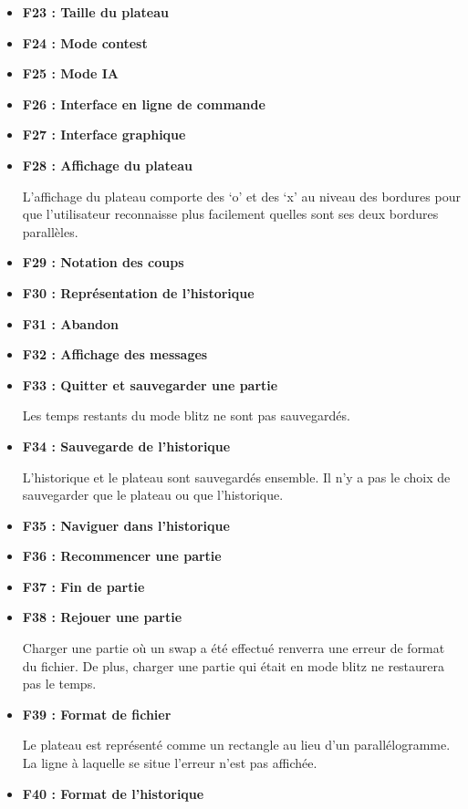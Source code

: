 \documentclass[12pt]{article}
\begin{document}
\begin{itemize}
    Au lieu de changer de couleur, le second joueur peut choisir d’écraser le coup du premier. Ceci produit le même résultat et permet de conserver sa couleur.
    \item \textbf{F23 : Taille du plateau}
    \item \textbf{F24 : Mode contest}
    \item \textbf{F25 : Mode IA}
    \item \textbf{F26 : Interface en ligne de commande}
    \item \textbf{F27 : Interface graphique}
    \item \textbf{F28 : Affichage du plateau}

    L’affichage du plateau comporte des ‘o’ et des ‘x’ au niveau des bordures pour que l’utilisateur reconnaisse plus facilement quelles sont ses deux bordures parallèles.
    \item \textbf{F29 : Notation des coups}
    \item \textbf{F30 : Représentation de l’historique}
    \item \textbf{F31 : Abandon}
    \item \textbf{F32 : Affichage des messages}
    \item \textbf{F33 : Quitter et sauvegarder une partie}

    Les temps restants du mode blitz ne sont pas sauvegardés.
    \item \textbf{F34 : Sauvegarde de l’historique}

    L’historique et le plateau sont sauvegardés ensemble. Il n’y a pas le choix de sauvegarder que le plateau ou que l’historique.
    \item \textbf{F35 : Naviguer dans l’historique}
    \item \textbf{F36 : Recommencer une partie}
    \item \textbf{F37 : Fin de partie}
    \item \textbf{F38 : Rejouer une partie}

    Charger une partie où un swap a été effectué renverra une erreur de format du fichier. De plus, charger une partie qui était en mode blitz ne restaurera pas le temps.
    \item \textbf{F39 : Format de fichier}

    Le plateau est représenté comme un rectangle au lieu d’un parallélogramme. La ligne à laquelle se situe l’erreur n’est pas affichée.
    \item \textbf{F40 : Format de l’historique}


\end{itemize}
\end{document}
